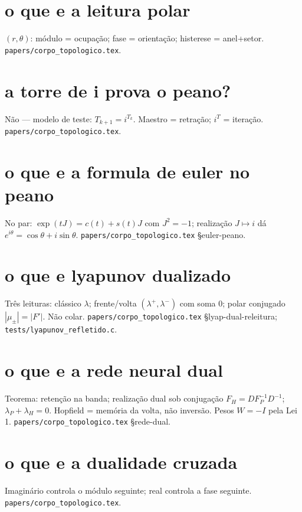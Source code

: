 \documentclass[11pt,a4paper]{article}
\newcommand{\code}[1]{\texttt{\small #1}}
\begin{document}
\section{o que e a leitura polar}
$(r,\theta)$: módulo = ocupação; fase = orientação; histerese = anel+setor.
\code{papers/corpo\_topologico.tex}.

\section{a torre de i prova o peano?}
Não --- modelo de teste: $T_{k+1}=i^{T_k}$. Maestro = retração; $i^{T}$ = iteração.
\code{papers/corpo\_topologico.tex}.

\section{o que e a formula de euler no peano}
No par: $\exp(tJ)=c(t)+s(t)J$ com $J^{2}=-1$; realização $J\mapsto i$ dá $e^{i\theta}=\cos\theta+i\sin\theta$.
\code{papers/corpo\_topologico.tex} \S euler-peano.

\section{o que e lyapunov dualizado}
Três leituras: clássico $\lambda$; frente/volta $(\lambda^{+},\lambda^{-})$ com soma $0$; polar conjugado $|\mu_{\pm}|=|F'|$.
Não colar. \code{papers/corpo\_topologico.tex} \S lyap-dual-releitura; \code{tests/lyapunov\_refletido.c}.

\section{o que e a rede neural dual}
Teorema: retenção na banda; realização dual sob conjugação $F_H=D F_P^{-1} D^{-1}$; $\lambda_P+\lambda_H=0$.
Hopfield = memória da volta, não inversão. Pesos $W=-I$ pela Lei 1.
\code{papers/corpo\_topologico.tex} \S rede-dual.

\section{o que e a dualidade cruzada}
Imaginário controla o módulo seguinte; real controla a fase seguinte.
\code{papers/corpo\_topologico.tex}.
\end{document}
